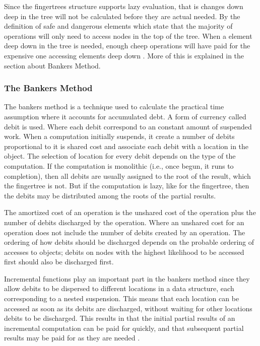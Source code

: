 Since the fingertrees structure supports lazy evaluation, that is changes down
deep in the tree will not be calculated before they are actual needed. By the
definition of safe and dangerous elements which state that the majority of
operations will only need to access nodes in the top of the tree. When a
element deep down in the tree is needed, enough cheep operations will have paid
for the expensive one accessing elements deep down \cite{fingertree}. More of
this is explained in the section about Bankers Method.


\subsubsection{The Bankers Method}
The bankers method is a technique used to calculate the practical time
assumption where it accounts for accumulated debt. A form of currency called
debit is used. Where each debit correspond to an constant amount of suspended
work. When a computation initially suspends, it create a number of debits
proportional to it is shared cost and associate each debit with a location
in the object. The selection of location for every debit depends on the type
of the computation. If the computation is monolithic (i.e., once begun, it
runs to completion), then all debits are usually assigned to the root of the
result, which the fingertree is not. But if the computation is lazy, like for
the fingertree, then the debits may be distributed among the roots of the partial
results.

The amortized cost of an operation is the unshared cost of the operation
plus the number of debits discharged by the operation. Where an unshared cost
for an operation does not include the number of debits created by an operation.
The ordering of how debits should be discharged depends on the probable ordering
of accesses to objects; debits on nodes with the highest likelihood to be accessed
first should also be discharged first.

Incremental functions play an important part in the bankers method since
they allow debits to be dispersed to different locations in a data structure,
each corresponding to a nested suspension. This means that each location can be
accessed as soon as its debits are discharged, without waiting for other
locations debits to be discharged. This results in that the initial partial
results of an incremental computation can be paid for quickly, and that
subsequent partial results may be paid for as they are needed \cite{Okasaki1999}.

